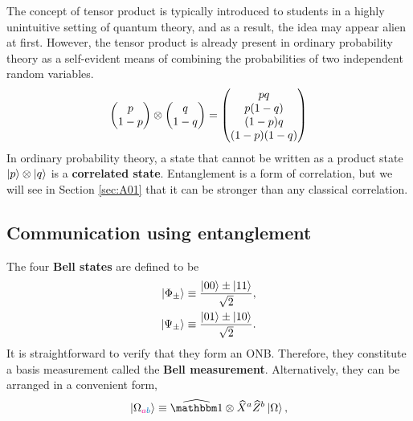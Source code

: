 \begin{mybox}
The concept of tensor product is typically introduced to students in a highly unintuitive setting of quantum theory, and as a result, the idea may appear alien at first. However, the tensor product is already present in ordinary probability theory as a self-evident means of combining the probabilities of two independent random variables.
\begin{align}
	\mqty(p \\ 1-p) \otimes \mqty(q\\1-q) = \mqty(pq \\ p(1-q) \\ (1-p)q \\ (1-p)(1-q))
\end{align}
In ordinary probability theory, a state that cannot be written as a product state $\ket{p}\otimes\ket{q}$ is a {\bf correlated state}. Entanglement is a form of correlation, but we will see in Section \ref{sec:A01} that it can be stronger than any classical correlation.
\end{mybox}

\subsection{Communication using entanglement}

The four {\bf Bell states} are defined to be
\begin{align}
	\ket{\Phi_{\pm}} &\equiv \frac{\ket{00}\pm\ket{11}}{\sqrt{2}}, \\
	\ket{\Psi_{\pm}} &\equiv 
	\frac{\ket{01}\pm\ket{10}}{\sqrt{2}}.
\end{align}
It is straightforward to verify that they form an ONB. Therefore, they constitute a basis measurement called the {\bf Bell measurement}.
Alternatively, they can be arranged in a convenient form, 
\begin{align}\label{eq:steering}
	\ket{\Omega_{{\color{magenta}\tikzmark{a}a}{\color{eqcolor}\tikzmark{b}b}}} \equiv \op\id\otimes \op X^a\op Z^b \ket{\Omega},
\end{align}





